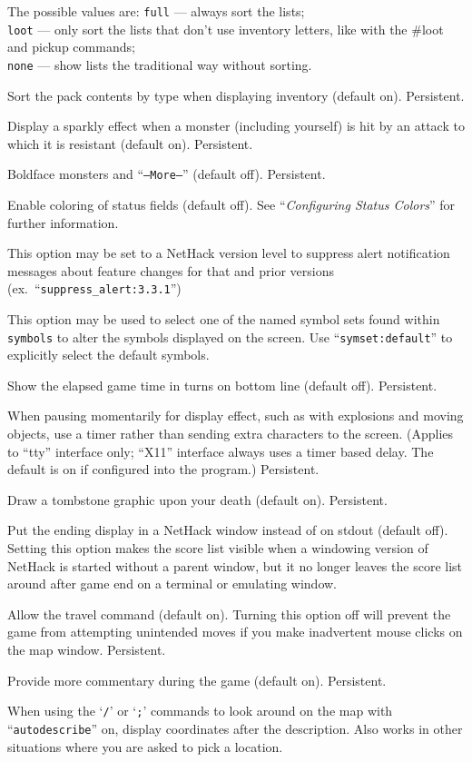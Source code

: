 The possible values are:
{\tt full} --- always sort the lists;\\
{\tt loot} --- only sort the lists that don't use inventory
       letters, like with the \#loot and pickup commands;\\
{\tt none} --- show lists the traditional way without sorting.
\item[\ib{sortpack}]
Sort the pack contents by type when displaying inventory (default on).
Persistent.
\item[\ib{sparkle}]
Display a sparkly effect when a monster (including yourself) is hit by an
attack to which it is resistant (default on).  Persistent.
\item[\ib{standout}]
Boldface monsters and ``{\tt --More--}'' (default off).  Persistent.
\item[\ib{statuscolors}]
Enable coloring of status fields (default off).
See ``{\it Configuring Status Colors\/}'' for further information.
\item[\ib{suppress\verb+_+alert}]
This option may be set to a NetHack version level to suppress
alert notification messages about feature changes for that 
and prior versions (ex.\ ``{\tt suppress\verb+_+alert:3.3.1}'')
\item[\ib{symset}]
This option may be used to select one of the named symbol sets found within
{\tt symbols} to alter the symbols displayed on the screen.
Use ``{\tt symset:default}'' to explicitly select the default symbols.
\item[\ib{time}]
Show the elapsed game time in turns on bottom line (default off).  Persistent.
\item[\ib{timed\verb+_+delay}]
When pausing momentarily for display effect, such as with explosions and
moving objects, use a timer rather than sending extra characters to the
screen.  (Applies to ``tty'' interface only; ``X11'' interface always
uses a timer based delay.  The default is on if configured into the
program.)  Persistent.
\item[\ib{tombstone}]
Draw a tombstone graphic upon your death (default on).  Persistent.
\item[\ib{toptenwin}]
Put the ending display in a NetHack window instead of on stdout (default off).
Setting this option makes the score list visible when a windowing version
of NetHack is started without a parent window, but it no longer leaves
the score list around after game end on a terminal or emulating window.
\item[\ib{travel}]
Allow the travel command (default on).  Turning this option off will
prevent the game from attempting unintended moves if you make inadvertent
mouse clicks on the map window.  Persistent.
\item[\ib{verbose}]
Provide more commentary during the game (default on).  Persistent.
\item[\ib{whatis\verb+_+coord}]
When using the `{\tt /}' or `{\tt ;}' commands to look around on the map with
``{\tt autodescribe}''
on, display coordinates after the description.
Also works in other situations where you are asked to pick a location.

